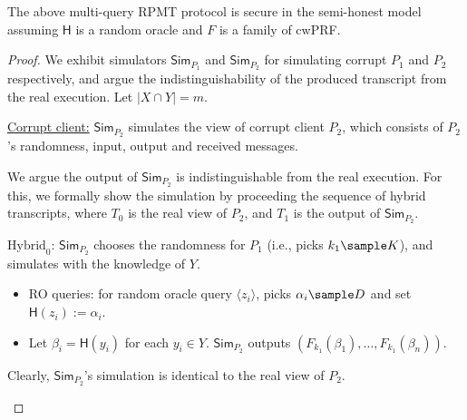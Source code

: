 \documentclass[a4paper,10pt]{article}
\begin{document}
\begin{theorem}
The above multi-query RPMT protocol is secure in the semi-honest model assuming $\mathsf{H}$ is a random oracle 
and $F$ is a family of cwPRF.
\end{theorem}

\begin{proof}
We exhibit simulators $\mathsf{Sim}_{P_1}$ and $\mathsf{Sim}_{P_2}$ for simulating corrupt $P_1$ and $P_2$ respectively, 
and argue the indistinguishability of the produced transcript from the real execution. Let $|X \cap Y| = m$. 

\begin{trivlist}
\item \underline{Corrupt client:} $\mathsf{Sim}_{P_2}$ simulates the view of corrupt client $P_2$, 
    which consists of $P_2$'s randomness, input, output and received messages.
 
    We argue the output of $\mathsf{Sim}_{P_2}$ is indistinguishable from the real execution. 
    For this, we formally show the simulation by proceeding the sequence of hybrid transcripts, 
    where $T_0$ is the real view of $P_2$, and $T_1$ is the output of $\mathsf{Sim}_{P_2}$. 

\item $\text{Hybrid}_0$: $\mathsf{Sim}_{P_2}$ chooses the randomness for $P_1$ (i.e., picks $k_1 \sample K$), 
    and simulates with the knowledge of $Y$. 
\begin{itemize}
    \item RO queries: for random oracle query $\langle z_i \rangle$, 
        picks $\alpha_i \sample D$ and set $\mathsf{H}(z_i):=\alpha_i$. 

    \item Let $\beta_i = \mathsf{H}(y_i)$ for each $y_i \in Y$. 
        $\mathsf{Sim}_{P_2}$ outputs $(F_{k_1}(\beta_1), \dots, F_{k_1}(\beta_n))$.     
\end{itemize}
Clearly, $\mathsf{Sim}_{P_2}$'s simulation is identical to the real view of $P_2$. 

\begin{center}
\end{center}
\end{trivlist}
\end{proof}
\end{document}
